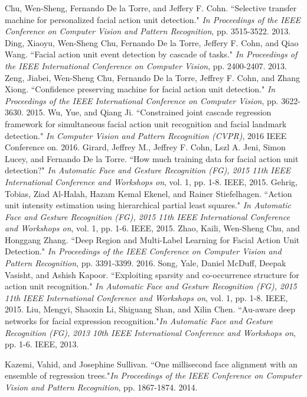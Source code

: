 \documentclass[a4paper, 10pt, conference]{ieeeconf}      %
\begin{document}
\begin{thebibliography}{99}
Chu, Wen-Sheng, Fernando De la Torre, and Jeffery F. Cohn. ``Selective transfer machine for personalized facial action unit detection." {\it In Proceedings of the IEEE Conference on Computer Vision and Pattern Recognition}, pp. 3515-3522. 2013.
Ding, Xiaoyu, Wen-Sheng Chu, Fernando De la Torre, Jeffery F. Cohn, and Qiao Wang. ``Facial action unit event detection by cascade of tasks." {\it In Proceedings of the IEEE International Conference on Computer Vision}, pp. 2400-2407. 2013.
Zeng, Jiabei, Wen-Sheng Chu, Fernando De la Torre, Jeffrey F. Cohn, and Zhang Xiong. ``Confidence preserving machine for facial action unit detection." {\it In Proceedings of the IEEE International Conference on Computer Vision}, pp. 3622-3630. 2015.
Wu, Yue, and Qiang Ji. ``Constrained joint cascade regression framework for simultaneous facial action unit recognition and facial landmark detection." {\it In Computer Vision and Pattern Recognition (CVPR)}, 2016 IEEE Conference on. 2016.
Girard, Jeffrey M., Jeffrey F. Cohn, Lszl A. Jeni, Simon Lucey, and Fernando De la Torre. ``How much training data for facial action unit detection?" {\it In Automatic Face and Gesture Recognition (FG), 2015 11th IEEE International Conference and Workshops on}, vol. 1, pp. 1-8. IEEE, 2015.
Gehrig, Tobias, Ziad Al-Halah, Hazam Kemal Ekenel, and Rainer Stiefelhagen. ``Action unit intensity estimation using hierarchical partial least squares." {\it In Automatic Face and Gesture Recognition (FG), 2015 11th IEEE International Conference and Workshops on}, vol. 1, pp. 1-6. IEEE, 2015.
Zhao, Kaili, Wen-Sheng Chu, and Honggang Zhang. ``Deep Region and Multi-Label Learning for Facial Action Unit Detection." {\it In Proceedings of the IEEE Conference on Computer Vision and Pattern Recognition}, pp. 3391-3399. 2016.
Song, Yale, Daniel McDuff, Deepak Vasisht, and Ashish Kapoor. ``Exploiting sparsity and co-occurrence structure for action unit recognition." {\it In Automatic Face and Gesture Recognition (FG), 2015 11th IEEE International Conference and Workshops on}, vol. 1, pp. 1-8. IEEE, 2015.
Liu, Mengyi, Shaoxin Li, Shiguang Shan, and Xilin Chen. ``Au-aware deep networks for facial expression recognition."{\it  In Automatic Face and Gesture Recognition (FG), 2013 10th IEEE International Conference and Workshops on}, pp. 1-6. IEEE, 2013.

Kazemi, Vahid, and Josephine Sullivan. ``One millisecond face alignment with an ensemble of regression trees."{\it  In Proceedings of the IEEE Conference on Computer Vision and Pattern Recognition}, pp. 1867-1874. 2014.


\end{thebibliography}
\end{document}
